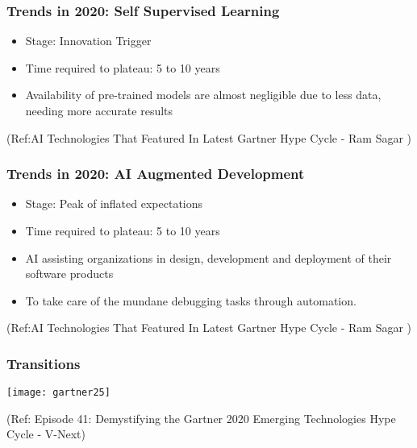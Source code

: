 \begin{frame}[fragile]\frametitle{Trends in 2020: Self Supervised Learning}
\begin{itemize}
\item Stage: Innovation Trigger
\item Time required to plateau: 5 to 10 years
\item Availability of pre-trained models are almost negligible due to less data, needing more accurate results
\end{itemize}


{\tiny (Ref:AI Technologies That Featured In Latest Gartner Hype Cycle - 
Ram Sagar )}

\end{frame}


\begin{frame}[fragile]\frametitle{Trends in 2020: AI Augmented Development}
\begin{itemize}
\item Stage: Peak of inflated expectations
\item Time required to plateau: 5 to 10 years
\item AI assisting organizations in design, development and deployment of their software products
\item To take care of the mundane debugging tasks through automation.
\end{itemize}


{\tiny (Ref:AI Technologies That Featured In Latest Gartner Hype Cycle - 
Ram Sagar )}

\end{frame}


\begin{frame}[fragile]\frametitle{Transitions}

\begin{center}
\texttt{[image: gartner25]}
\end{center}

{\tiny (Ref: Episode 41: Demystifying the Gartner 2020 Emerging Technologies Hype Cycle - V-Next)}

\end{frame}


